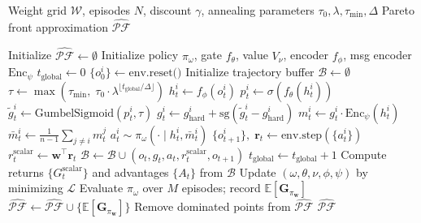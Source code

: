 \documentclass[runningheads]{llncs}
\newcommand{\E}{\mathbb{E}}
\newcommand{\PF}{\mathcal{PF}}
\newcommand{\W}{\mathcal{W}}
\newcommand{\sg}{\mathrm{sg}}
\newcommand{\bw}{\mathbf{w}}
\newcommand{\bG}{\mathbf{G}}
\newcommand{\br}{\mathbf{r}}
\begin{document}
\begin{algorithm}[t]
\caption{ParetoComm Training}
\label{alg:paretocomm}
\begin{algorithmic}[1]
\Require Weight grid $\W$, episodes $N$, discount $\gamma$,
         annealing parameters $\tau_0, \lambda, \tau_\text{min}, \Delta$
\Ensure Pareto front approximation $\hat{\PF}$

\State Initialize $\hat{\PF} \leftarrow \emptyset$
\For{each $\bw = (w_1, w_2) \in \W$}
  \State Initialize policy $\pi_\omega$, gate $f_\theta$,
         value $V_\nu$, encoder $f_\phi$, msg encoder $\text{Enc}_\psi$
  \State $t_\text{global} \leftarrow 0$
    \State $\{o^i_0\} \leftarrow \text{env.reset()}$
    \State Initialize trajectory buffer $\mathcal{B} \leftarrow \emptyset$
      \State $\tau \leftarrow \max(\tau_\text{min},\;\tau_0 \cdot \lambda^{\lfloor t_\text{global}/\Delta\rfloor})$
        \State $h^i_t \leftarrow f_\phi(o^i_t)$
        \State $p^i_t \leftarrow \sigma(f_\theta(h^i_t))$
        \State $\tilde{g}^i_t \leftarrow \text{GumbelSigmoid}(p^i_t, \tau)$
        \State $g^i_t \leftarrow g^i_\text{hard} + \sg(\tilde{g}^i_t - g^i_\text{hard})$
        \State $m^i_t \leftarrow g^i_t \cdot \text{Enc}_\psi(h^i_t)$
      \EndFor
        \State $\bar{m}^i_t \leftarrow \frac{1}{n-1}\sum_{j \neq i} m^j_t$
        \State $a^i_t \sim \pi_\omega(\cdot \mid h^i_t, \bar{m}^i_t)$
      \EndFor
      \State $\{o^i_{t+1}\},\; \br_t \leftarrow \text{env.step}(\{a^i_t\})$
      \State $r^\text{scalar}_t \leftarrow \bw^\top \br_t$
      \State $\mathcal{B} \leftarrow \mathcal{B} \cup (o_t, g_t, a_t, r^\text{scalar}_t, o_{t+1})$
      \State $t_\text{global} \leftarrow t_\text{global} + 1$
    \EndFor
    \State Compute returns $\{G^\text{scalar}_t\}$ and advantages $\{A_t\}$ from $\mathcal{B}$
    \State Update $(\omega, \theta, \nu, \phi, \psi)$ by minimizing $\mathcal{L}$
  \EndFor
  \State Evaluate $\pi_\omega$ over $M$ episodes; record $\E[\bG_{\pi_\bw}]$
  \State $\hat{\PF} \leftarrow \hat{\PF} \cup \{\E[\bG_{\pi_\bw}]\}$
\EndFor
\State Remove dominated points from $\hat{\PF}$
\State \Return $\hat{\PF}$
\end{algorithmic}
\end{algorithm}
\end{document}
